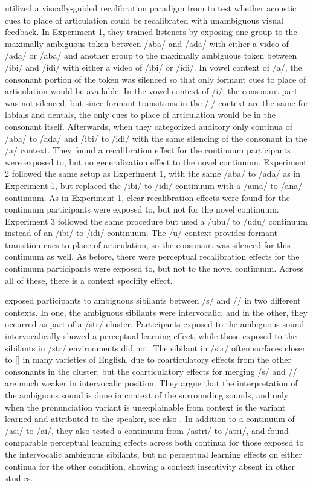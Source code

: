 \documentclass[11pt]{article} %
\begin{document}
\citet{Reinisch2014} utilized a visually-guided recalibration paradigm from \citet{Bertelson2003} to test whether acoustic cues to place of articulation could be recalibrated with unambiguous visual feedback.  
In Experiment 1, they trained listeners by exposing one group to the maximally ambiguous token between /aba/ and /ada/ with either a video of /ada/ or /aba/ and another group to the maximally ambiguous token between /ibi/ and /idi/ with either a video of /ibi/ or /idi/.  
In vowel context of /a/, the consonant portion of the token was silenced so that only formant cues to place of articulation would be available.  
In the vowel context of /i/, the consonant part was not silenced, but since formant transitions in the /i/ context are the same for labials and dentals, the only cues to place of articulation would be in the consonant itself.  
Afterwards, when they categorized auditory only continua of /aba/ to /ada/ and /ibi/ to /idi/ with the same silencing of the consonant in the /a/ context.  They found a recalibration effect for the continuum participants were exposed to, but no generalization effect to the novel continuum.  
Experiment 2 followed the same setup as Experiment 1, with the same /aba/ to /ada/ as in Experiment 1, but replaced the /ibi/ to /idi/ continuum with a /ama/ to /ana/ continuum.  
As in Experiment 1, clear recalibration effects were found for the continuum participants were exposed to, but not for the novel continuum.  
Experiment 3 followed the same procedure but used a /ubu/ to /udu/ continuum instead of an /ibi/ to /idi/ continuum.  
The /u/ context provides formant transition cues to place of articulation, so the consonant was silenced for this continuum as well.  
As before, there were perceptual recalibration effects for the continuum participants were exposed to, but not to the novel continuum.  
Across all of these, there is a context specifity effect. 

\citet{Kraljic2008a} exposed participants to ambiguous sibilants between /s/ and /\textesh/ in two different contexts.  
In one, the ambiguous sibilants were intervocalic, and in the other, they occurred as part of a /str/ cluster.  
Participants exposed to the ambiguous sound intervocalically showed a perceptual learning effect, while those exposed to the sibilants in /str/ environments did not.  
The sibilant in /str/ often surfaces closer to [\textesh] in many varieties of English, due to coarticulatory effects from the other consonants in the cluster, but the coarticulatory effects for merging /s/ and /\textesh/ are much weaker in intervocalic position.  
They argue that the interpretation of the ambiguous sound is done in context of the surrounding sounds, and only when the pronunciation variant is unexplainable from context is the variant learned and attributed to the speaker, see also \citet{Kraljic2008}.  
In addition to a continuum of /asi/ to /a\textesh i/, they also tested a continuum from /astri/ to /a\textesh tri/, and found comparable perceptual learning effects across both continua for those exposed to the intervocalic ambiguous sibilants, but no perceptual learning effects on either continua for the other condition, showing a context insentivity absent in other studies.
\end{document}
